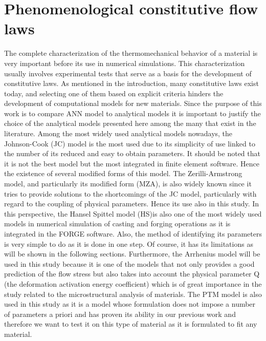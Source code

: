 \documentclass[twoside,english,1p,final,sort&compress]{elsarticle}
\theoremstyle{plain}
\begin{document}
\section{Phenomenological constitutive flow laws\label{sec:ConstLaws}}
The complete characterization of the thermomechanical behavior of a material is very important before its use in numerical simulations. This characterization usually involves experimental tests that serve as a basis for the development of constitutive laws. As mentioned in the introduction, many constitutive laws exist today, and selecting one of them based on explicit criteria hinders the development of computational models for new materials. Since the purpose of this work is to compare ANN model to analytical models it is important to justify the choice of the analytical models presented here among the many that exist in the literature. Among the most widely used analytical models nowadays, the Johnson-Cook (JC) model is the most used due to its simplicity of use linked to the number of its reduced and easy to obtain parameters. It should be noted that it is not the best model but the most integrated in finite element software. Hence the existence of several modified forms of this model. The Zerilli-Armstrong model, and particularly its modified form (MZA), is also widely known since it tries to provide solutions to the shortcomings of the JC model, particularly with regard to the coupling of physical parameters. Hence its use also in this study. In this perspective, the Hansel Spittel model (HS)is also one of the most widely used models in numerical simulation of casting and forging operations as it is integrated in the FORGE software. Also, the method of identifying its parameters is very simple to do as it is done in one step. Of course, it has its limitations as will be shown in the following sections. Furthermore, the Arrhenius model will be used in this study because it is one of the models that not only provides a good prediction of the flow stress but also takes into account the physical parameter Q (the deformation activation energy coefficient) which is of great importance in the study related to the microstructural analysis of materials. The PTM model is also used in this study as it is a model whose formulation does not impose a number of parameters a priori and has proven its ability in our previous work and therefore we want to test it on this type of material as it is formulated to fit any material. 
\end{document}
